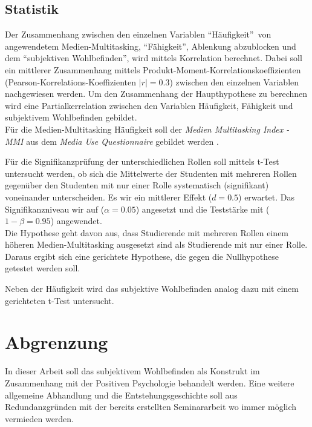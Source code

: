 \subsection*{Statistik}
Der Zusammenhang zwischen den einzelnen Variablen \textquotedblleft Häufigkeit\textquotedblright \ von angewendetem Medien-Multitasking, \textquotedblleft Fähigkeit\textquotedblright, Ablenkung abzublocken und dem \textquotedblleft subjektiven Wohlbefinden\textquotedblright, wird mittels Korrelation berechnet. Dabei soll ein mittlerer Zusammenhang mittels Produkt-Moment-Korrelationskoeffizienten (Pearson-Korrelations-Koeffizienten $|r|=0.3$) zwischen den einzelnen Variablen nachgewiesen werden. Um den Zusammenhang der Haupthypothese zu berechnen wird eine Partialkerrelation zwischen den Variablen Häufigkeit, Fähigkeit und subjektivem Wohlbefinden gebildet.\\
Für die Medien-Multitasking Häufigkeit soll der \textit{Medien Multitasking Index - MMI} aus dem \textit{Media Use Questionnaire} gebildet werden \cite{Ophir2009}.\par
Für die Signifikanzprüfung der unterschiedlichen Rollen soll mittels t-Test untersucht werden, ob sich die Mittelwerte der Studenten mit mehreren Rollen gegenüber den Studenten mit nur einer Rolle systematisch (signifikant) voneinander unterscheiden. Es wir ein mittlerer Effekt ($d=0.5$) erwartet. Das Signifikanzniveau wir auf ($\alpha=0.05$) angesetzt und die Teststärke mit ($1-\beta=0.95$) angewendet.\\
Die Hypothese geht davon aus, dass Studierende mit mehreren Rollen einem höheren Medien-Multitasking ausgesetzt sind als Studierende mit nur einer Rolle. Daraus ergibt sich eine gerichtete Hypothese, die gegen die Nullhypothese getestet werden soll.\par
Neben der Häufigkeit wird das subjektive Wohlbefinden analog dazu mit einem gerichteten t-Test untersucht.
\section*{Abgrenzung}\label{section.abgrenzung}
In dieser Arbeit soll das subjektivem Wohlbefinden als Konstrukt im Zusammenhang mit der Positiven Psychologie behandelt werden. Eine weitere allgemeine Abhandlung und die Entstehungsgeschichte soll aus Redundanzgründen mit der bereits erstellten Seminararbeit \cite{Ernst2013} wo immer möglich vermieden werden.
